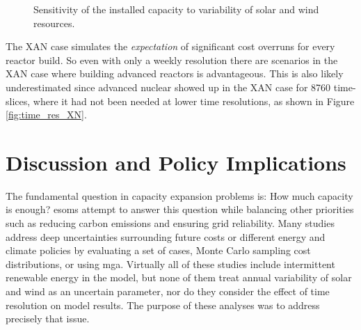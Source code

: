 \begin{figure}[H]
  \centering
  \resizebox{0.95\columnwidth}{!}{}
  \caption{Sensitivity of the installed capacity to variability of
   solar and wind resources.}
  \label{fig:il_capacity}
\end{figure}

The XAN case simulates the
\textit{expectation} of significant cost overruns for every reactor build. So
even with only a weekly resolution there are scenarios in the XAN case where building
advanced reactors is advantageous. This is also likely underestimated since advanced
nuclear showed up in the XAN case for 8760 time-slices, where it had not been needed
at lower time resolutions, as shown in Figure \ref{fig:time_res_XN}.

\section{Discussion and Policy Implications}

The fundamental question in capacity expansion problems is: How much capacity is enough?
\glspl{esom} attempt to answer this question while balancing other priorities such
as reducing carbon emissions and ensuring grid reliability. Many studies address
deep uncertainties surrounding future costs
\cite{alzbutas_uncertainty_2012,barron_differential_2015,komiyama_energy_2015,
li_open_2020,yue_least_2020} or different energy and climate policies \cite{bennett_extending_2021,
bouckaert_expanding_2014,de_sisternes_value_2016,decarolis_modelling_2016,neumann_near-optimal_2021,
seck_embedding_2020} by evaluating a set of cases, Monte Carlo sampling cost distributions,
or using \gls{mga}. Virtually all of these studies include intermittent renewable
energy in the model, but none of them treat annual variability of solar and wind
as an uncertain parameter, nor do they consider the effect of time resolution on
model results. The purpose of these analyses was to address precisely that issue.

